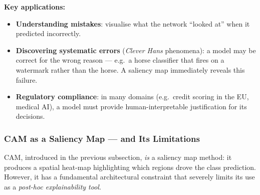 \documentclass[11pt,a4paper]{article}
\begin{document}
\textbf{Key applications:}
\begin{itemize}
  \item \textbf{Understanding mistakes}: visualise what the network ``looked at'' when it predicted incorrectly.
  \item \textbf{Discovering systematic errors} (\emph{Clever Hans} phenomena): a model may be correct for the wrong reason — e.g.\ a horse classifier that fires on a watermark rather than the horse. A saliency map immediately reveals this failure.
  \item \textbf{Regulatory compliance}: in many domains (e.g.\ credit scoring in the EU, medical AI), a model must provide human-interpretable justification for its decisions.
\end{itemize}

\subsubsection{CAM as a Saliency Map — and Its Limitations}
\label{sec:cam_limitation}

CAM, introduced in the previous subsection, \emph{is} a saliency map method: it produces a spatial heat-map highlighting which regions drove the class prediction. However, it has a fundamental architectural constraint that severely limits its use as a \emph{post-hoc explainability tool}.
\end{document}
